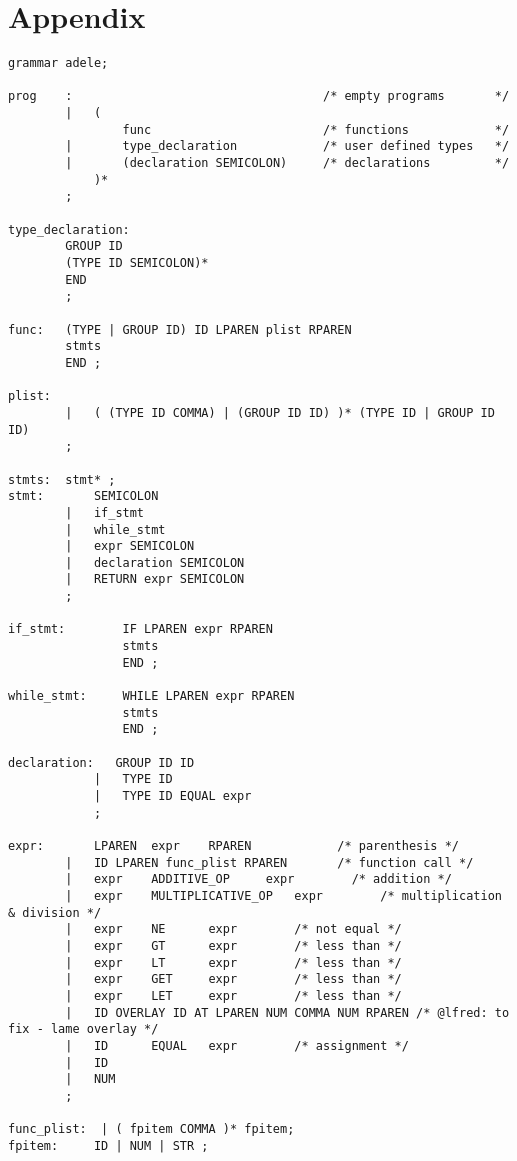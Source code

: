 \documentclass[11pt,letterpaper]{article}
\begin{document}
\section{Appendix}
\begin{lstlisting}[tabsize=4, ]
grammar adele;

prog    :                                   /* empty programs       */ 
        |   ( 
                func                        /* functions            */
        |       type_declaration            /* user defined types   */
        |       (declaration SEMICOLON)     /* declarations         */
            )*              
        ;
        
type_declaration:
        GROUP ID 
        (TYPE ID SEMICOLON)* 
        END
        ;

func:   (TYPE | GROUP ID) ID LPAREN plist RPAREN 
        stmts
        END ;

plist:  
        |   ( (TYPE ID COMMA) | (GROUP ID ID) )* (TYPE ID | GROUP ID ID) 
        ;

stmts:  stmt* ;
stmt:       SEMICOLON       
        |   if_stmt       
        |   while_stmt      
        |   expr SEMICOLON  
        |   declaration SEMICOLON
        |   RETURN expr SEMICOLON
        ;

if_stmt:        IF LPAREN expr RPAREN 
                stmts 
                END ;

while_stmt:     WHILE LPAREN expr RPAREN 
                stmts 
                END ;

declaration:   GROUP ID ID
            |   TYPE ID 
            |   TYPE ID EQUAL expr
            ;

expr:       LPAREN  expr    RPAREN            /* parenthesis */
        |   ID LPAREN func_plist RPAREN       /* function call */
        |   expr    ADDITIVE_OP     expr        /* addition */
        |   expr    MULTIPLICATIVE_OP   expr        /* multiplication & division */
        |   expr    NE      expr        /* not equal */
        |   expr    GT      expr        /* less than */
        |   expr    LT      expr        /* less than */
        |   expr    GET     expr        /* less than */
        |   expr    LET     expr        /* less than */
        |   ID OVERLAY ID AT LPAREN NUM COMMA NUM RPAREN /* @lfred: to fix - lame overlay */
        |   ID      EQUAL   expr        /* assignment */
        |   ID  
        |   NUM
        ; 

func_plist:  | ( fpitem COMMA )* fpitem;
fpitem:     ID | NUM | STR ;


\end{lstlisting}
\end{document}
